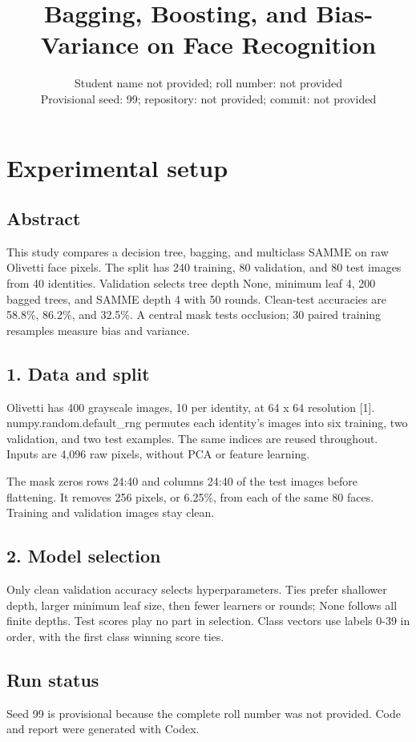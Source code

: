 \documentclass[10pt,twocolumn,letterpaper]{article}
\title{Bagging, Boosting, and Bias-Variance on Face Recognition}
\author{Student name not provided; roll number: not provided\\Provisional seed: 99; repository: not provided; commit: not provided}
\begin{document}
\maketitle
\section*{Experimental setup}
\subsection*{Abstract}
This study compares a decision tree, bagging, and multiclass SAMME on raw Olivetti face pixels. The split has 240 training, 80 validation, and 80 test images from 40 identities. Validation selects tree depth None, minimum leaf 4, 200 bagged trees, and SAMME depth 4 with 50 rounds. Clean-test accuracies are 58.8\%, 86.2\%, and 32.5\%. A central mask tests occlusion; 30 paired training resamples measure bias and variance.

\subsection*{1. Data and split}
Olivetti has 400 grayscale images, 10 per identity, at 64 x 64 resolution [1]. numpy.random.default\_rng permutes each identity's images into six training, two validation, and two test examples. The same indices are reused throughout. Inputs are 4,096 raw pixels, without PCA or feature learning.

The mask zeros rows 24:40 and columns 24:40 of the test images before flattening. It removes 256 pixels, or 6.25\%, from each of the same 80 faces. Training and validation images stay clean.

\subsection*{2. Model selection}
Only clean validation accuracy selects hyperparameters. Ties prefer shallower depth, larger minimum leaf size, then fewer learners or rounds; None follows all finite depths. Test scores play no part in selection. Class vectors use labels 0-39 in order, with the first class winning score ties.

\newpage
\subsection*{Run status}
Seed 99 is provisional because the complete roll number was not provided. Code and report were generated with Codex.
\end{document}
